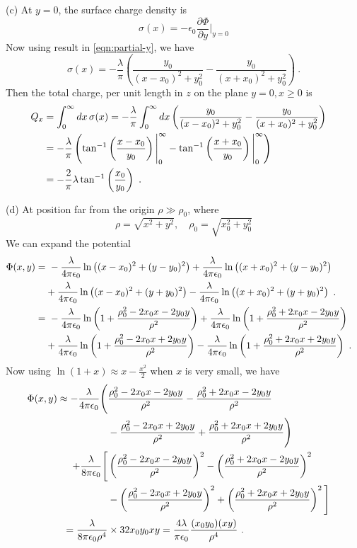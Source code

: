 \documentclass[12pt]{article}
\begin{document}
\newpage
{} (c) At $y = 0$, the surface charge density is
\begin{equation}
    \sigma(x) = - \epsilon_0 \frac{\partial \Phi}{\partial y}\Bigg|_{y = 0}
\end{equation}
Now using result in \eqref{eqn:partial-y}, we have
\begin{equation}
    \sigma(x) = -\frac{\lambda}{\pi}\left( \frac{y_0}{(x-x_0)^2 + y_0^2} - \frac{y_0}{(x+x_0)^2 + y_0^2} \right)~.
\end{equation}
Then the total charge, per unit length in $z$ on the plane $y = 0, x \ge 0$ is
\begin{align}
    Q_x &= \int_0^\infty dx\, \sigma(x) = -\frac{\lambda}{\pi}\int_0^\infty dx\left( \frac{y_0}{(x-x_0)^2 + y_0^2} - \frac{y_0}{(x+x_0)^2 + y_0^2} \right)\cr
    &= -\frac{\lambda}{\pi} \left(\tan^{-1}\left(\frac{x-x_0}{y_0}\right)\Bigg|_{0}^{\infty} - \tan^{-1}\left(\frac{x+x_0}{y_0}\right)\Bigg|_{0}^{\infty} \right)\cr
    &= - \frac{2}{\pi} \lambda \tan^{-1} \left(\frac{x_0}{y_0}\right)~.
\end{align}

\newpage
{} (d) At position far from the origin $\rho \gg \rho_0$, where
\begin{equation}
    \rho = \sqrt{x^2 + y^2}, \quad \rho_0 = \sqrt{x_0^2 + y_0^2}
\end{equation}
We can expand the potential
\begin{align}
    \Phi(x,y) = &~ -\frac{\lambda}{4 \pi \epsilon_0} \ln\left({(x-x_0)^2 + (y - y_0)^2}\right)
    + \frac{\lambda}{4 \pi \epsilon_0} \ln\left({(x+x_0)^2 + (y - y_0)^2}\right)\cr
    &+ \frac{\lambda}{4 \pi \epsilon_0} \ln\left({(x-x_0)^2 + (y + y_0)^2}\right) - \frac{\lambda}{4 \pi \epsilon_0} \ln\left({(x+x_0)^2 + (y + y_0)^2}\right)~.\cr
    =&~ -\frac{\lambda}{4 \pi \epsilon_0} \ln\left(1 + \frac{\rho_0^2 - 2x_0 x - 2y_0 y}{\rho^2}\right) + \frac{\lambda}{4\pi \epsilon_0} \ln\left(1 + \frac{\rho_0^2 + 2x_0x - 2y_0y}{\rho^2}\right)\cr
    &+ \frac{\lambda}{4\pi \epsilon_0} \ln\left(1 + \frac{\rho_0^2 - 2x_0x + 2y_0 y}{\rho^2} \right) - \frac{\lambda}{4\pi \epsilon_0}\ln\left( 1 + \frac{\rho_0^2 + 2x_0x + 2y_0y}{\rho^2}\right)~.\nonumber
\end{align}
Now using $\ln(1 + x) \approx x - \frac{x^2}{2}$ when $x$ is very small, we have
\begin{align}
    \Phi(x,y) \approx -\frac{\lambda}{4\pi \epsilon_0} \Bigg(&\frac{\rho_0^2 - 2x_0 x - 2y_0y}{\rho^2} -\frac{\rho_0^2 + 2x_0x -2y_0y}{\rho^2}  \cr
    &-\frac{\rho_0^2 - 2x_0 x + 2y_0 y}{\rho^2} + \frac{\rho_0^2 + 2x_0 x + 2y_0 y}{\rho^2}\Bigg)\cr
    + \frac{\lambda}{8\pi \epsilon_0} \Bigg[& \left(\frac{\rho_0^2 - 2x_0 x - 2y_0y}{\rho^2}\right)^2 - \left(\frac{\rho_0^2 + 2x_0 x - 2y_0y}{\rho^2}\right)^2 \cr
    &- \left(\frac{\rho_0^2 - 2x_0 x + 2y_0 y}{\rho^2} \right)^2 + \left(\frac{\rho_0^2 + 2x_0 x + 2y_0y}{\rho^2} \right)^2 \Bigg]\cr
    =\frac{\lambda}{8 \pi \epsilon_0 \rho^4} &\times 32 x_0 y_0 x y = \frac{4\lambda}{\pi \epsilon_0} \frac{(x_0 y_0)(xy)}{\rho^4}~.
\end{align}
\end{document}
